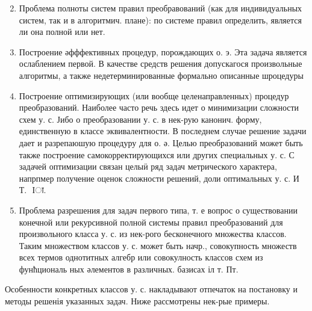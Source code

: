 \documentclass[10pt]{article}
\begin{document}
\begin{enumerate}

  \setcounter{enumi}{1}

  \item Проблема полноты систем правил преобравований (как для индивидуальных систем, так и в алгоритмич. плане): по системе правил определить, является ли она полной или нет.



  \item Построение әфффективных процедур, порождающих о. э. Эта задача является ослаблением первой. В качестве средств решения допускагося произвольные алгоритмы, а также недетерминированные формально описанные шроцедуры



  \item Построение оптимизирующих (или вообще целенаправленных) процедур преобразований. Наиболее часто речь здесь идет о минимизации сложности схем у. с. Јибо о преобразовании у. с. в нек-рую канонич. форму, единственную в классе эквивалентности. В последнем случае решение задачи дает и разрепаюшую процедуру для о. ә. Целью преобразований может быть также построение самокорректирующихся или других специальных у. с. С задачей оптимизации связан целыӥ ряд задач метрического характера, напрпмер получение оценок сложности решений, доли оптимальных у. с. И Т. $\boldsymbol{\text { Іा. }}$



  \item Проблема разрешения для задач первого типа, т. е вопрос о существовании конечной или рекурсивной полной системы правил преобразований для произвольного класса у. с. из нек-рого бесконечного множества классов. Таким множеством классов у. с. может быть начр., совокупность множеств всех термов однотитных алгебр или совокулность классов схем из фунћциональ ных әлементов в различных. базисах іл т. Пт.



\end{enumerate}



Особенности конкретных классов у. с. накладывают отпечаток на постановку и методы решенія указанных задач. Ниже рассмотрены нек-рые примеры.
\end{document}
